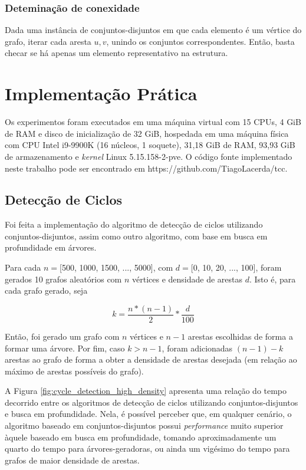 \documentclass[article,a4paper,12pt,brazil,sumario=tradicional]{abntex2}
\theoremstyle{definition} %
\begin{document}
\subsubsection{Deteminação de conexidade}

Dada uma instância de conjuntos-disjuntos em que cada elemento é um vértice do grafo, iterar cada aresta $u, v$, unindo os conjuntos correspondentes. Então, basta checar se há apenas um elemento representativo na estrutura.



\section{Implementação Prática}

Os experimentos foram executados em uma máquina virtual com 15 CPUs, 4 GiB de RAM e disco de inicialização de 32 GiB, hospedada em uma máquina física com CPU Intel i9-9900K (16 núcleos, 1 soquete), 31,18 GiB de RAM, 93,93 GiB de armazenamento e \textit{kernel} Linux 5.15.158-2-pve. O código fonte implementado neste trabalho pode ser encontrado em https://github.com/TiagoLacerda/tcc.

\subsection{Detecção de Ciclos}

Foi feita a implementação do algoritmo de detecção de ciclos utilizando conjuntos-disjuntos, assim como outro algoritmo, com base em busca em profundidade em árvores.

Para cada $n=$[500, 1000, 1500, ..., 5000], com $d=$[0, 10, 20, ..., 100], foram gerados 10 grafos aleatórios com $n$ vértices e densidade de arestas $d$. Isto é, para cada grafo gerado, seja 

\begin{equation*}
    k=\frac{n * (n - 1)}{2}*\frac{d}{100}
\end{equation*}

Então, foi gerado um grafo com $n$ vértices e $n - 1$ arestas escolhidas de forma a formar uma árvore. Por fim, caso $k > n - 1$, foram adicionadas $(n - 1) - k$ arestas ao grafo de forma a obter a densidade de arestas desejada (em relação ao máximo de arestas possíveis do grafo).

A Figura \ref{fig:cycle_detection_high_density} apresenta uma relação do tempo decorrido entre os algoritmos de detecção de ciclos utilizando conjuntos-disjuntos e busca em profundidade. Nela, é possível perceber que, em qualquer cenário, o algoritmo baseado em conjuntos-disjuntos possui \textit{performance} muito superior àquele baseado em busca em profundidade, tomando aproximadamente um quarto do tempo para árvores-geradoras, ou ainda um vigésimo do tempo para grafos de maior densidade de arestas.
\end{document}
